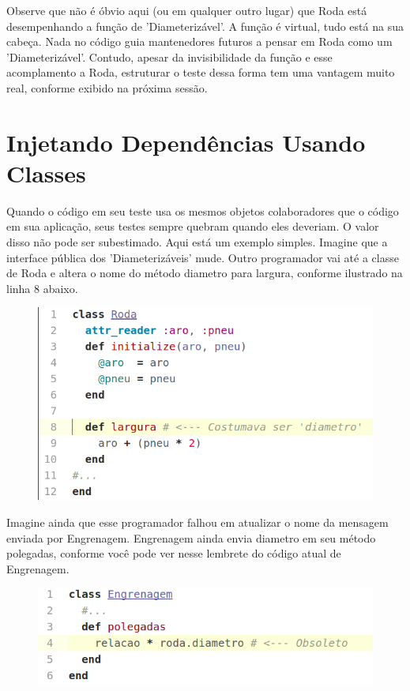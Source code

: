 Observe que não é óbvio aqui (ou em qualquer outro lugar) que Roda está
desempenhando a função de 'Diameterizável'. A função é virtual, tudo está na sua
cabeça. Nada no código guia mantenedores futuros a pensar em Roda como um
'Diameterizável'. Contudo, apesar da invisibilidade da função e esse
acomplamento a Roda, estruturar o teste dessa forma tem uma vantagem muito real,
conforme exibido na próxima sessão.

\section{Injetando Dependências Usando Classes}

Quando o código em seu teste usa os mesmos objetos colaboradores que o código em
sua aplicação, seus testes sempre quebram quando eles deveriam. O valor disso
não pode ser subestimado.
Aqui está um exemplo simples. Imagine que a interface pública dos
'Diameterizáveis' mude. Outro programador vai até a classe de Roda e altera o
nome do método diametro para largura, conforme ilustrado na linha 8 abaixo.

\begin{figure}[!htbp]
  \center
  \includegraphics[scale=0.50]{imagens/codigo_pag_207_a.png}
  \label{img:codigo_pag_207_a}
\end{figure}

Imagine ainda que esse programador falhou em atualizar o nome da mensagem
enviada por Engrenagem. Engrenagem ainda envia diametro em seu método polegadas,
conforme você pode ver nesse lembrete do código atual de Engrenagem.

\begin{figure}[!htbp]
  \center
  \includegraphics[scale=0.50]{imagens/codigo_pag_207_b.png}
  \label{img:codigo_pag_207_b}
\end{figure}


